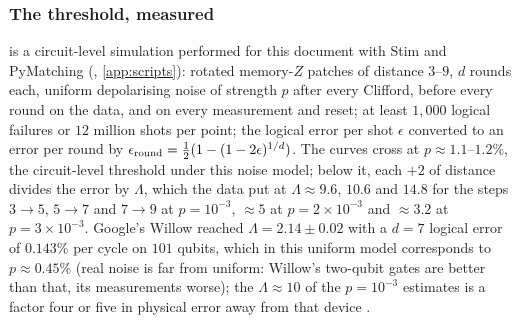 \subsubsection{The threshold, measured}\label{sec:threshold}
 is a circuit-level simulation performed for this document with Stim and PyMatching (, \cref{app:scripts}): rotated memory-$Z$ patches of distance $3$--$9$, $d$ rounds each, uniform depolarising noise of strength $p$ after every Clifford, before every round on the data, and on every measurement and reset; at least $1{,}000$ logical failures or $12$ million shots per point; the logical error per shot $\epsilon$ converted to an error per round by $\epsilon_{\rm round}=\frac12(1-(1-2\epsilon)^{1/d})$. The curves cross at $p\approx1.1$--$1.2\%$, the circuit-level threshold under this noise model; below it, each $+2$ of distance divides the error by $\Lambda$, which the data put at $\Lambda\approx9.6$, $10.6$ and $14.8$ for the steps $3\to5$, $5\to7$ and $7\to9$ at $p=10^{-3}$, $\approx5$ at $p=2\times10^{-3}$ and $\approx3.2$ at $p=3\times10^{-3}$. Google's Willow reached $\Lambda=2.14\pm0.02$ with a $d=7$ logical error of $0.143\%$ per cycle on $101$ qubits, which in this uniform model corresponds to $p\approx0.45\%$ (real noise is far from uniform: Willow's two-qubit gates are better than that, its measurements worse); the $\Lambda\approx10$ of the $p=10^{-3}$ estimates is a factor four or five in physical error away from that device \cite{willow25}.

